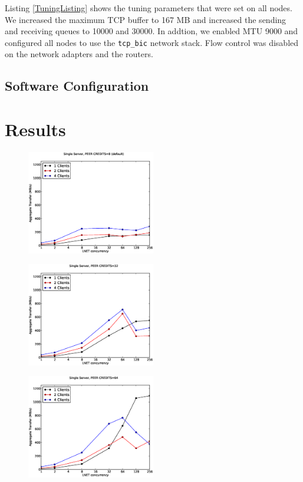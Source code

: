 \documentclass[]{sigplan-proc}
\begin{document}
Listing \ref{TuningListing} shows the tuning parameters that were set on all nodes. We increased the maximum TCP buffer to 167 MB and increased the sending and receiving queues to 10000 and 30000. In addtion, we enabled MTU 9000 and configured all nodes to use the \texttt{tcp\_bic} network stack. Flow control was disabled on the network adapters and the routers.

\subsection{Software Configuration}




\section{Results}\label{sec:results}

\begin{figure}
\centering
\includegraphics[width=0.50\textwidth]{figures/default_pc_plot.eps}
\caption{}
\label{}
\end{figure}

\begin{figure}
\centering
\includegraphics[width=0.50\textwidth]{figures/32pc_plot.eps}
\caption{}
\label{}
\end{figure}

\begin{figure}
\centering
\includegraphics[width=0.50\textwidth]{figures/64pc_plot.eps}
\caption{}
\label{}
\end{figure}
\end{document}
